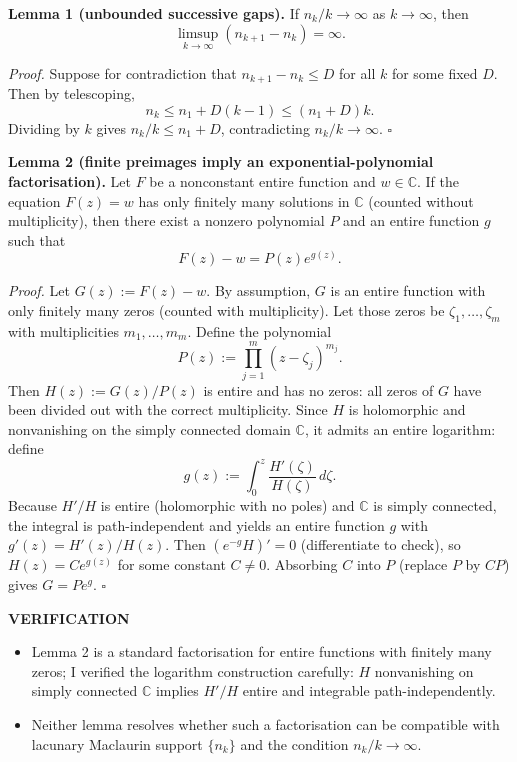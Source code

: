 \medskip
\noindent\textbf{Lemma 1 (unbounded successive gaps).}
If $n_k/k\to\infty$ as $k\to\infty$, then
\[
\limsup_{k\to\infty} (n_{k+1}-n_k)=\infty.
\]

\textit{Proof.}
Suppose for contradiction that $n_{k+1}-n_k\le D$ for all $k$ for some fixed $D$. Then by telescoping,
\[
n_k \le n_1 + D(k-1) \le (n_1+D)k.
\]
Dividing by $k$ gives $n_k/k\le n_1+D$, contradicting $n_k/k\to\infty$.
\hfill$\square$

\medskip
\noindent\textbf{Lemma 2 (finite preimages imply an exponential-polynomial factorisation).}
Let $F$ be a nonconstant entire function and $w\in\mathbb{C}$. If the equation $F(z)=w$ has only finitely many solutions in $\mathbb{C}$ (counted without multiplicity), then there exist a nonzero polynomial $P$ and an entire function $g$ such that
\[
F(z)-w = P(z) e^{g(z)}.
\]

\textit{Proof.}
Let $G(z):=F(z)-w$. By assumption, $G$ is an entire function with only finitely many zeros (counted with multiplicity). Let those zeros be $\zeta_1,\dots,\zeta_m$ with multiplicities $m_1,\dots,m_m$.
Define the polynomial
\[
P(z):=\prod_{j=1}^m (z-\zeta_j)^{m_j}.
\]
Then $H(z):=G(z)/P(z)$ is entire and has no zeros: all zeros of $G$ have been divided out with the correct multiplicity. Since $H$ is holomorphic and nonvanishing on the simply connected domain $\mathbb{C}$, it admits an entire logarithm: define
\[
 g(z):=\int_0^z \frac{H'(\zeta)}{H(\zeta)}\,d\zeta.
\]
Because $H'/H$ is entire (holomorphic with no poles) and $\mathbb{C}$ is simply connected, the integral is path-independent and yields an entire function $g$ with $g'(z)=H'(z)/H(z)$. Then $(e^{-g}H)'=0$ (differentiate to check), so $H(z)=C e^{g(z)}$ for some constant $C\neq 0$. Absorbing $C$ into $P$ (replace $P$ by $CP$) gives $G=P e^{g}$.
\hfill$\square$

\medskip
\noindent\textbf{VERIFICATION}

\begin{itemize}
\item Lemma 2 is a standard factorisation for entire functions with finitely many zeros; I verified the logarithm construction carefully: $H$ nonvanishing on simply connected $\mathbb{C}$ implies $H'/H$ entire and integrable path-independently.
\item Neither lemma resolves whether such a factorisation can be compatible with lacunary Maclaurin support $\{n_k\}$ and the condition $n_k/k\to\infty$.
\end{itemize}

